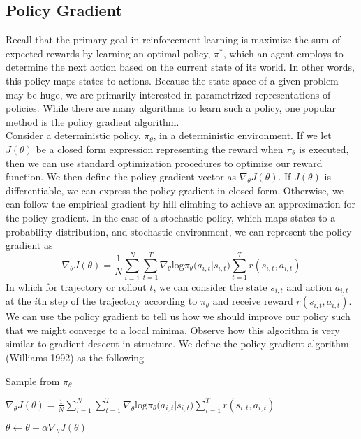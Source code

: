 \documentclass[journal,onecolumn]{IEEEtran}
\begin{document}
\subsection{Policy Gradient} Recall that the primary goal in reinforcement learning is maximize the sum of expected rewards by learning an optimal policy, $\pi^{*}$, which an agent employs to determine the next action based on the current state of its world. In other words, this policy maps states to actions. Because the state space of a given problem may be huge, we are primarily interested in parametrized representations of policies. While there are many algorithms to learn such a policy, one popular method is the policy gradient algorithm. \\
Consider a deterministic policy, $\pi_{\theta}$, in a deterministic environment. If we let $J(\theta)$ be a closed form expression representing the reward when $\pi_{\theta}$ is executed, then we can use standard optimization procedures to optimize our reward function. We then define the policy gradient vector as $\nabla_{\theta} J(\theta)$. If $J(\theta)$ is differentiable, we can express the policy gradient in closed form. Otherwise, we can follow the empirical gradient by hill climbing to achieve an approximation for the policy gradient. In the case of a stochastic policy, which maps states to a probability distribution, and stochastic environment, we can represent the policy gradient as
\[
\nabla_{\theta} J(\theta) = \frac{1}{N} \sum_{i=1}^{N}{\sum_{t=1}^{T}\nabla_{\theta}\text{log}\pi_{\theta}(a_{i,t}|s_{i,t}})\sum_{t=1}^{T}{r(s_{i,t}, a_{i,t})}
\]
In which for trajectory or rollout $t$, we can consider the state $s_{i,t}$ and action $a_{i,t}$  at the $i$th step of the trajectory according to $\pi_{\theta}$ and receive reward $r(s_{i,t} ,a_{i,t} )$. We can use the policy gradient to tell us how we should improve our policy such that we might converge to a local minima. Observe how this algorithm is very similar to gradient descent in structure. We define the policy gradient algorithm (Williams 1992) as the following
\begin{algorithmic}
		\item Sample from $\pi_{\theta}$
		\item $\nabla_{\theta} J(\theta) = \frac{1}{N} \sum_{i=1}^{N}{\sum_{t=1}^{T}\nabla_{\theta}\text{log}\pi_{\theta}(a_{i,t}|s_{i,t}})\sum_{t=1}^{T}{r(s_{i,t}, a_{i,t})}$
		\item $\theta \gets \theta + \alpha\nabla_{\theta}J(\theta)$
\EndProcedure
\end{algorithmic}
\end{document}

